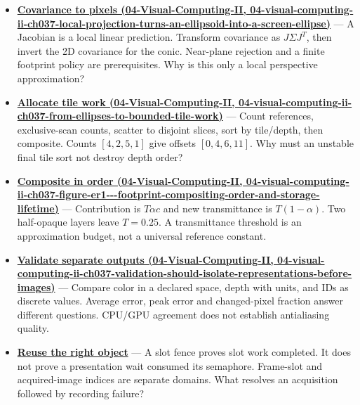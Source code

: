 \begin{itemize}
\item
  \textbf{\href{../04-Visual-Computing-II/main.pdf\#nameddest=04-visual-computing-ii-ch037-local-projection-turns-an-ellipsoid-into-a-screen-ellipse}{Covariance to pixels (04-Visual-Computing-II, 04-visual-computing-ii-ch037-local-projection-turns-an-ellipsoid-into-a-screen-ellipse)}} --- A Jacobian is a local linear prediction. Transform covariance as \(J\Sigma J^T\), then invert the 2D covariance for the conic. Near-plane rejection and a finite footprint policy are prerequisites. Why is this only a local perspective approximation?
\item
  \textbf{\href{../04-Visual-Computing-II/main.pdf\#nameddest=04-visual-computing-ii-ch037-from-ellipses-to-bounded-tile-work}{Allocate tile work (04-Visual-Computing-II, 04-visual-computing-ii-ch037-from-ellipses-to-bounded-tile-work)}} --- Count references, exclusive-scan counts, scatter to disjoint slices, sort by tile/depth, then composite. Counts \([4,2,5,1]\) give offsets \([0,4,6,11]\). Why must an unstable final tile sort not destroy depth order?
\item
  \textbf{\href{../04-Visual-Computing-II/main.pdf\#nameddest=04-visual-computing-ii-ch037-figure-er1---footprint-compositing-order-and-storage-lifetime}{Composite in order (04-Visual-Computing-II, 04-visual-computing-ii-ch037-figure-er1-\/-\/-footprint-compositing-order-and-storage-lifetime)}} --- Contribution is \(T\alpha c\) and new transmittance is \(T(1-\alpha)\). Two half-opaque layers leave \(T=0.25\). A transmittance threshold is an approximation budget, not a universal reference constant.
\item
  \textbf{\href{../04-Visual-Computing-II/main.pdf\#nameddest=04-visual-computing-ii-ch037-validation-should-isolate-representations-before-images}{Validate separate outputs (04-Visual-Computing-II, 04-visual-computing-ii-ch037-validation-should-isolate-representations-before-images)}} --- Compare color in a declared space, depth with units, and IDs as discrete values. Average error, peak error and changed-pixel fraction answer different questions. CPU/GPU agreement does not establish antialiasing quality.
\item
  \textbf{\hyperref[01-foundations-i-ch011-follow-a-frame-slot-and-a-presentation-image-separately]{Reuse the right object}} --- A slot fence proves slot work completed. It does not prove a presentation wait consumed its semaphore. Frame-slot and acquired-image indices are separate domains. What resolves an acquisition followed by recording failure?

\end{itemize}
